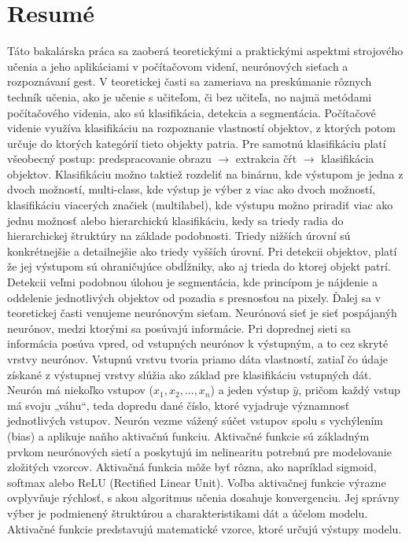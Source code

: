 \chapter{Resumé}
 \label{ch:resume}
Táto bakalárska práca sa zaoberá teoretickými a praktickými aspektmi strojového učenia a jeho aplikáciami v počítačovom videní, neurónových sieťach a rozpoznávaní gest. V teoretickej časti sa zameriava na preskúmanie rôznych techník učenia, ako je učenie s učiteľom, či bez učiteľa, no najmä metódami počítačového videnia, ako sú klasifikácia, detekcia a segmentácia.\newline
 Počítačové videnie využíva klasifikáciu na rozpoznanie vlastností objektov, z ktorých potom určuje do ktorých kategórií tieto objekty patria. Pre samotnú klasifikáciu platí všeobecný postup: predspracovanie obrazu $\to$ extrakcia čŕt $\to$ klasifikácia objektov. Klasifikáciu možno taktiež rozdeliť na binárnu, kde výstupom je jedna z dvoch možností, multi-class, kde výstup je výber z viac ako dvoch možností, klasifikáciu viacerých značiek (multilabel), kde výstupu možno priradiť viac ako jednu možnosť alebo hierarchickú klasifikáciu, kedy sa triedy radia do hierarchickej štruktúry na základe podobnosti. Triedy nižších úrovní sú konkrétnejšie a detailnejšie ako triedy vyšších úrovní. Pri detekcii objektov, platí že jej výstupom sú ohraničujúce obdĺžniky, ako aj trieda do ktorej objekt patrí. Detekcii veľmi podobnou úlohou je segmentácia, kde princípom je nájdenie a oddelenie jednotlivých objektov od pozadia s presnosťou na pixely.\newline
Ďalej sa v teoretickej časti venujeme neurónovým sieťam. Neurónová sieť je sieť pospájanýh neurónov, medzi ktorými sa posúvajú informácie.	Pri doprednej sieti sa informácia posúva vpred, od vstupných neurónov k výstupným, a to cez skryté vrstvy neurónov. Vstupnú vrstvu tvoria priamo dáta vlastností, zatiaľ čo údaje získané z výstupnej vrstvy slúžia ako základ pre klasifikáciu vstupných dát. Neurón má niekoľko vstupov  ($x_1, x_2, ..., x_n$) a jeden výstup $\hat{y}$, pričom každý vstup má svoju „váhu“, teda dopredu dané číslo, ktoré vyjadruje významnosť jednotlivých vstupov. Neurón vezme vážený súčet vstupov spolu s vychýlením (bias) a aplikuje naňho aktivačnú funkciu. Aktivačné funkcie sú základným prvkom neurónových sietí a poskytujú im nelinearitu potrebnú pre modelovanie zložitých vzorcov. Aktivačná funkcia môže byť rôzna, ako napríklad sigmoid, softmax alebo ReLU (Rectified Linear Unit). Voľba aktivačnej funkcie výrazne ovplyvňuje rýchlosť, s akou algoritmus učenia dosahuje konvergenciu. Jej správny výber je podmienený štruktúrou a charakteristikami dát a účelom modelu. Aktivačné funkcie predstavujú matematické vzorce, ktoré určujú výstupy modelu. \newline
